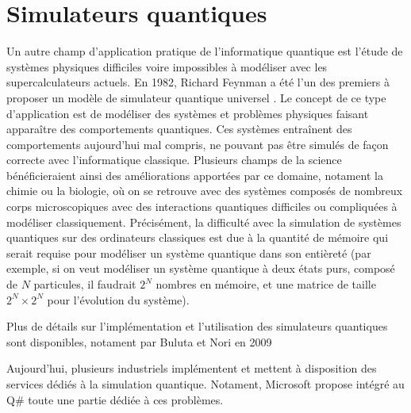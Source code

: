 \section{Simulateurs quantiques}

Un autre champ d'application pratique de l'informatique quantique est l'étude de systèmes physiques difficiles voire impossibles à modéliser avec les supercalculateurs actuels. En 1982, Richard Feynman a été l'un des premiers à proposer un modèle de simulateur quantique universel \cite{Feynman82}. Le concept de ce type d'application est de modéliser des systèmes et problèmes physiques faisant apparaître des comportements quantiques. Ces systèmes entraînent des comportements aujourd'hui mal compris, ne pouvant pas être simulés de façon correcte avec l'informatique classique. Plusieurs champs de la science bénéficieraient ainsi des améliorations apportées par ce domaine, notament la chimie ou la biologie, où on se retrouve avec des systèmes composés de nombreux corps microscopiques avec des interactions quantiques difficiles ou compliquées à modéliser classiquement. Précisément, la difficulté avec la simulation de systèmes quantiques sur des ordinateurs classiques est due à la quantité de mémoire qui serait requise pour modéliser un système quantique dans son entièreté (par exemple, si on veut modéliser un système quantique à deux états purs, composé de $N$ particules, il faudrait $2^N$ nombres en mémoire, et une matrice de taille $2^N \times 2^N$ pour l'évolution du système). 

Plus de détails sur l'implémentation et l'utilisation des simulateurs quantiques sont disponibles, notament par Buluta et Nori en 2009 \cite{Buluta2009}

Aujourd'hui, plusieurs industriels implémentent et mettent à disposition des services dédiés à la simulation quantique. Notament, Microsoft propose intégré au Q\# toute une partie dédiée à ces problèmes. 